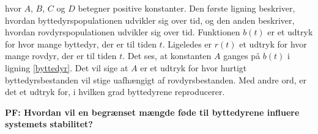 \hfill \break
hvor $A$, $B$, $C$ og $D$ betegner positive konstanter. Den første ligning beskriver, hvordan byttedyrspopulationen udvikler sig over tid, og den anden beskriver, hvordan rovdyrspopulationen udvikler sig over tid. \hfill \break
Funktionen $b(t)$ er et udtryk for hvor mange byttedyr, der er til tiden $t$. Ligeledes er $r(t)$ et udtryk for hvor mange rovdyr, der er til tiden $t$. Det ses, at konstanten $A$ ganges på $b(t)$ i ligning \eqref{byttedyr}. Det vil sige at $A$ er et udtryk for hvor hurtigt byttedyrsbestanden vil stige uafhængigt af rovdyrsbestanden. Med andre ord, er det et udtryk for, i hvilken grad byttedyrene reproducerer.



\hfill \break
\textbf{PF: Hvordan vil en begrænset mængde føde til byttedyrene influere systemets stabilitet?}


